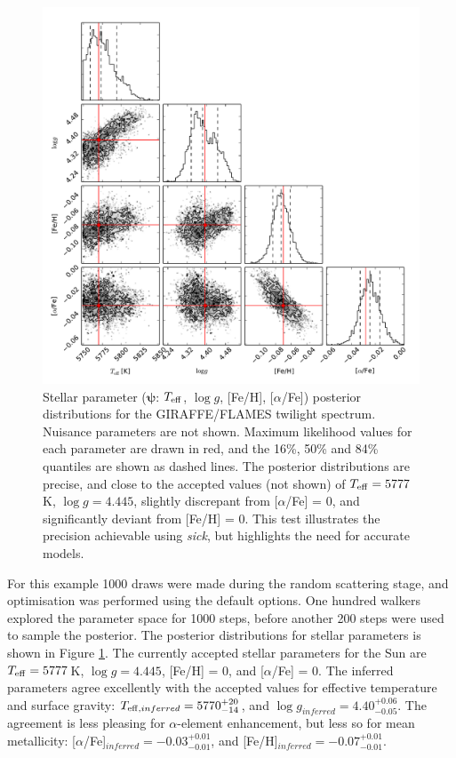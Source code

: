 \documentclass{aastex}
\newcommand{\sick}{\textit{sick}}
\begin{document}
\begin{figure}
\label{fig:solar}
\includegraphics[width=\textwidth]{solar.pdf}
\caption{Stellar parameter ($\bm{\psi}$: $T_{\rm eff}$, $\log{g}$, [Fe/H], [$\alpha$/Fe])  posterior distributions for the GIRAFFE/FLAMES twilight spectrum. Nuisance parameters are not shown. Maximum likelihood values for each parameter are drawn in red, and the 16\%, 50\% and 84\% quantiles are shown as dashed lines. The posterior distributions are precise, and close to the accepted values (not shown) of $T_{\rm eff} = 5777$\,K, $\log{g} = 4.445$, slightly discrepant from [$\alpha$/Fe] = 0, and significantly deviant from [Fe/H] = 0. This test illustrates the precision achievable using \sick, but highlights the need for accurate models.}
\end{figure}

For this example 1000 draws were made during the random scattering stage, and optimisation was performed using the default options. One hundred walkers explored the parameter space for 1000 steps, before another 200 steps were used to sample the posterior. The posterior distributions for stellar parameters is shown in Figure \ref{fig:solar}. The currently accepted stellar parameters for the Sun are $T_{\rm eff} = 5777$\,K, $\log{g} = 4.445$, [Fe/H] = 0, and [$\alpha$/Fe] = 0. The inferred parameters agree excellently with the accepted values for effective temperature and surface gravity: $T_{{\rm eff},inferred} = 5770^{+20}_{-14}$, and $\log{g}_{inferred} = 4.40^{+0.06}_{-0.05}$. The agreement is less pleasing for $\alpha$-element enhancement, but less so for mean metallicity: [$\alpha$/Fe]$_{inferred} = -0.03^{+0.01}_{-0.01}$, and [Fe/H]$_{inferred} = -0.07^{+0.01}_{-0.01}$. 
\end{document}
